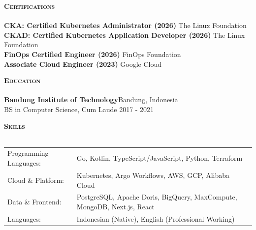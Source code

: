 \documentclass[a4paper]{article}
\newcommand{\lineunder} {
    \vspace*{-8pt} \\
    \hspace*{-18pt} \hrulefill \\
}
\newcommand{\header} [1] {
    {\hspace*{-18pt}\vspace*{6pt} \large \textbf{\textsc{#1}}}
    \vspace*{-6pt} \lineunder
}
\begin{document}
\header{Certifications}
\textbf{CKA: Certified Kubernetes Administrator (2026)} \hfill The Linux Foundation\\
\textbf{CKAD: Certified Kubernetes Application Developer (2026)} \hfill The Linux Foundation\\
\textbf{FinOps Certified Engineer (2026)} \hfill FinOps Foundation\\
\textbf{Associate Cloud Engineer (2023)} \hfill Google Cloud\\
\vspace{2mm}


\header{Education}
\textbf{Bandung Institute of Technology}\hfill Bandung, Indonesia\\
BS in Computer Science, Cum Laude \hfill 2017 - 2021\\
\vspace{2mm}

\header{Skills}
\begin{tabular}{ l l }
	Programming Languages: & Go, Kotlin, TypeScript/JavaScript, Python, Terraform \\
	Cloud \& Platform:     & Kubernetes, Argo Workflows, AWS, GCP, Alibaba Cloud \\
	Data \& Frontend:      & PostgreSQL, Apache Doris, BigQuery, MaxCompute, MongoDB, Next.js, React \\
	Languages:             & Indonesian (Native), English (Professional Working) \\
\end{tabular}
\vspace{2mm}
\end{document}
